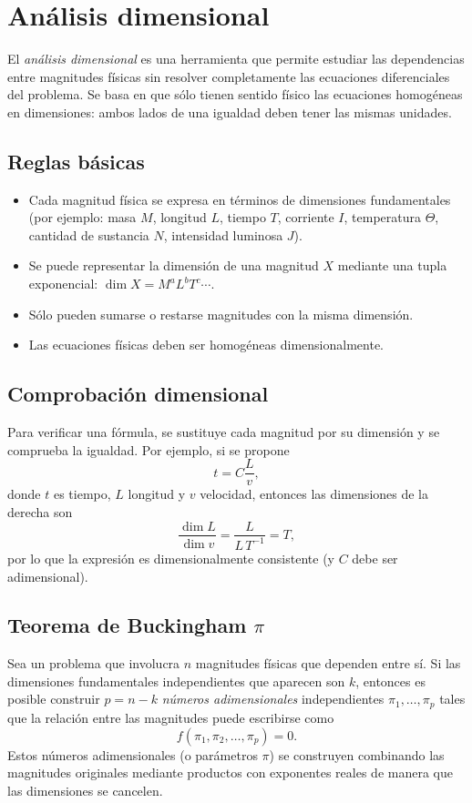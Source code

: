 \section{Análisis dimensional}
\label{sec:analisis-dimensional}

El \emph{análisis dimensional} es una herramienta que permite estudiar las dependencias entre magnitudes físicas sin resolver completamente las ecuaciones diferenciales del problema. Se basa en que sólo tienen sentido físico las ecuaciones homogéneas en dimensiones: ambos lados de una igualdad deben tener las mismas unidades.

\subsection{Reglas básicas}
\begin{itemize}
  \item Cada magnitud física se expresa en términos de dimensiones fundamentales (por ejemplo: masa $M$, longitud $L$, tiempo $T$, corriente $I$, temperatura $\Theta$, cantidad de sustancia $N$, intensidad luminosa $J$).
  \item Se puede representar la dimensión de una magnitud $X$ mediante una tupla exponencial: \(\dim X = M^{a} L^{b} T^{c} \cdots\).
  \item Sólo pueden sumarse o restarse magnitudes con la misma dimensión.
  \item Las ecuaciones físicas deben ser homogéneas dimensionalmente.
\end{itemize}

\subsection{Comprobación dimensional}
Para verificar una fórmula, se sustituye cada magnitud por su dimensión y se comprueba la igualdad. Por ejemplo, si se propone
\[
t = C \frac{L}{v},
\]
donde \(t\) es tiempo, \(L\) longitud y \(v\) velocidad, entonces las dimensiones de la derecha son
\[
\frac{\dim L}{\dim v} = \frac{L}{L\,T^{-1}} = T,
\]
por lo que la expresión es dimensionalmente consistente (y \(C\) debe ser adimensional).

\subsection{Teorema de Buckingham $\pi$}
Sea un problema que involucra \(n\) magnitudes físicas que dependen entre sí. Si las dimensiones fundamentales independientes que aparecen son \(k\), entonces es posible construir \(p=n-k\) \emph{números adimensionales} independientes \(\pi_1,\dots,\pi_p\) tales que la relación entre las magnitudes puede escribirse como
\[
f(\pi_1,\pi_2,\dots,\pi_p)=0.
\]
Estos números adimensionales (o parámetros $\pi$) se construyen combinando las magnitudes originales mediante productos con exponentes reales de manera que las dimensiones se cancelen.

